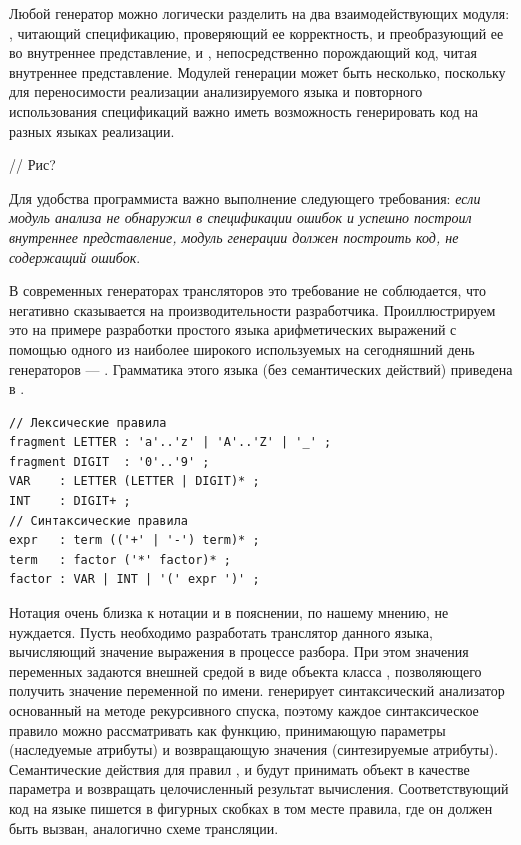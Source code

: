 Любой генератор можно логически разделить на два взаимодействующих модуля: , читающий спецификацию, проверяющий ее корректность, и преобразующий ее во внутреннее представление, и , непосредственно порождающий код, читая внутреннее представление.
Модулей генерации может быть несколько, поскольку для переносимости реализации анализируемого языка и повторного использования спецификаций важно иметь возможность генерировать код на разных языках реализации.

// Рис?

Для удобства программиста важно выполнение следующего требования: \emph{если модуль анализа не обнаружил в спецификации ошибок и успешно построил внутреннее представление, модуль генерации должен построить код, не содержащий ошибок}.

В современных генераторах трансляторов это требование не соблюдается, что негативно сказывается на производительности разработчика. Проиллюстрируем это на примере разработки простого языка арифметических выражений с помощью одного из наиболее широкого используемых на сегодняшний день генераторов --- . Грамматика этого языка (без семантических действий) приведена в .
\begin{lstlisting}[texcl,language=ANTLR,label=arithexp,float=htbp,caption=Спецификация \tool{ANTLR} для языка арифметических выражений]
// Лексические правила
fragment LETTER : 'a'..'z' | 'A'..'Z' | '_' ;
fragment DIGIT  : '0'..'9' ;
VAR    : LETTER (LETTER | DIGIT)* ;
INT    : DIGIT+ ;
// Синтаксические правила
expr   : term (('+' | '-') term)* ;
term   : factor ('*' factor)* ;
factor : VAR | INT | '(' expr ')' ;
\end{lstlisting}
Нотация  очень близка к нотации \GRM{} и в пояснении, по нашему мнению, не нуждается. Пусть необходимо разработать транслятор данного языка, вычисляющий значение выражения в процессе разбора. При этом значения переменных задаются внешней средой в виде объекта класса , позволяющего получить значение переменной по имени.  генерирует синтаксический анализатор основанный на методе рекурсивного спуска, поэтому каждое синтаксическое правило можно рассматривать как функцию, принимающую параметры (наследуемые атрибуты) и возвращающую значения (синтезируемые атрибуты). Семантические действия для правил ,  и  будут принимать объект  в качестве параметра и возвращать целочисленный результат вычисления. Соответствующий код на языке  пишется в фигурных скобках в том месте правила, где он должен быть вызван, аналогично схеме трансляции. 

